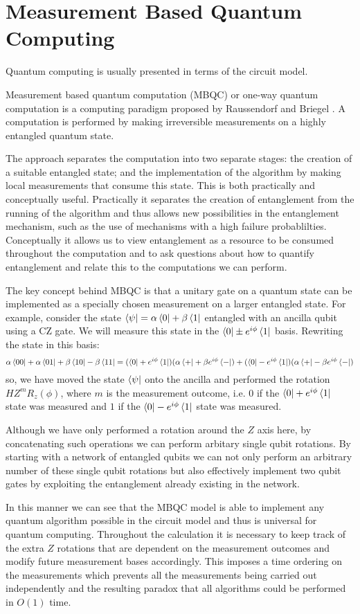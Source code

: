 \section{Measurement Based Quantum Computing}

Quantum computing is usually presented in terms of the circuit model. 

Measurement based quantum computation (MBQC) or one-way quantum computation is a computing paradigm proposed by Raussendorf and Briegel \cite{raussendorf01}. A computation is performed by making irreversible measurements on a highly entangled quantum state.

The approach separates the computation into two separate stages: the creation of a suitable entangled state; and the implementation of the algorithm by making local measurements that consume this state. This is both practically and conceptually useful. Practically it separates the creation of entanglement from the running of the algorithm and thus allows new possibilities in the entanglement mechanism, such as the use of mechanisms with a high failure probablilties. Conceptually it allows us to view entanglement as a resource to be consumed throughout the computation and to ask questions about how to quantify entanglement and relate this to the computations we can perform. 

The key concept behind MBQC is that a unitary gate on a quantum state can be implemented as a specially chosen measurement on a larger entangled state. For example, consider the state $\left\langle \psi\right\vert=\alpha\left\langle 0\right\vert+\beta\left\langle 1\right\vert$ entangled with an ancilla qubit using a CZ gate. We will measure this state in the $\left\langle 0\right\vert\pm e^{i\phi}\left\langle 1\right\vert$ basis. Rewriting the state in this basis:
\begin{equation}
\alpha\left\langle 00\right\vert+\alpha\left\langle 01\right\vert+\beta\left\langle 10\right\vert-\beta\left\langle 11\right\vert=(\left\langle 0\right\vert+e^{i\phi}\left\langle 1\right\vert)(\alpha\left\langle +\right\vert+\beta e^{i\phi}\left\langle -\right\vert)+(\left\langle 0\right\vert-e^{i\phi}\left\langle 1\right\vert)(\alpha\left\langle +\right\vert-\beta e^{i\phi}\left\langle -\right\vert)
\end{equation}
so, we have moved the state $\left\langle \psi\right\vert$ onto the ancilla and performed the rotation $HZ^{m}R_{z}(\phi)$, where $m$ is the measurement outcome, i.e. $0$ if the $\left\langle 0\right\vert+e^{i\phi}\left\langle 1\right\vert$ state was measured and $1$ if the $\left\langle 0\right\vert-e^{i\phi}\left\langle 1\right\vert$ state was measured.

Although we have only performed a rotation around the $Z$ axis here, by concatenating such operations we can perform arbitary single qubit rotations. By starting with a network of entangled qubits we can not only perform an arbitrary number of these single qubit rotations but also effectively implement two qubit gates by exploiting the entanglement already existing in the network.

In this manner we can see that the MBQC model is able to implement any quantum algorithm possible in the circuit model and thus is universal for quantum computing. Throughout the calculation it is necessary to keep track of the extra $Z$ rotations that are dependent on the measurement outcomes and modify future measurement bases accordingly. This imposes a time ordering on the measurements which prevents all the measurements being carried out independently and the resulting paradox that all algorithms could be performed in $O(1)$ time.  



